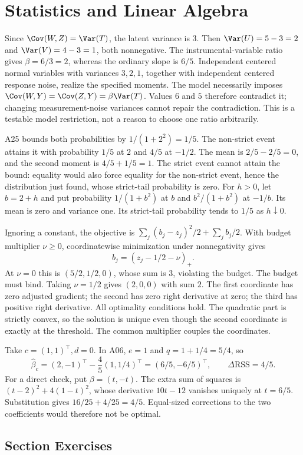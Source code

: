 \section{Statistics and Linear Algebra}

Since $\Cov(W,Z)=\Var(T)$, the latent variance is $3$. Then $\Var(U)=5-3=2$ and $\Var(V)=4-3=1$, both nonnegative. The instrumental-variable ratio gives $\beta=6/3=2$, whereas the ordinary slope is $6/5$. Independent centered normal variables with variances $3,2,1$, together with independent centered response noise, realize the specified moments.
The model necessarily imposes $\Cov(W,Y)=\Cov(Z,Y)=\beta\Var(T)$. Values $6$ and $5$ therefore contradict it; changing measurement-noise variances cannot repair the contradiction. This is a testable model restriction, not a reason to choose one ratio arbitrarily.

A25 bounds both probabilities by $1/(1+2^2)=1/5$. The non-strict event attains it with probability $1/5$ at $2$ and $4/5$ at $-1/2$. The mean is $2/5-2/5=0$, and the second moment is $4/5+1/5=1$.
The strict event cannot attain the bound: equality would also force equality for the non-strict event, hence the distribution just found, whose strict-tail probability is zero. For $h>0$, let $b=2+h$ and put probability $1/(1+b^2)$ at $b$ and $b^2/(1+b^2)$ at $-1/b$. Its mean is zero and variance one. Its strict-tail probability tends to $1/5$ as $h\downarrow0$.

Ignoring a constant, the objective is $\sum_j(b_j-z_j)^2/2+\sum_jb_j/2$. With budget multiplier $\nu\ge0$, coordinatewise minimization under nonnegativity gives
\[
 b_j=(z_j-1/2-\nu)_+.
\]
At $\nu=0$ this is $(5/2,1/2,0)$, whose sum is $3$, violating the budget. The budget must bind. Taking $\nu=1/2$ gives $(2,0,0)$ with sum $2$. The first coordinate has zero adjusted gradient; the second has zero right derivative at zero; the third has positive right derivative. All optimality conditions hold. The quadratic part is strictly convex, so the solution is unique even though the second coordinate is exactly at the threshold. The common multiplier couples the coordinates.

Take $c=(1,1)^\top,d=0$. In A06, $e=1$ and $q=1+1/4=5/4$, so
\[
 \widehat\beta_c=(2,-1)^\top-\frac45(1,1/4)^\top
 =(6/5,-6/5)^\top,
 \qquad\Delta\mathrm{RSS}=4/5.
\]
For a direct check, put $\beta=(t,-t)$. The extra sum of squares is $(t-2)^2+4(1-t)^2$, whose derivative $10t-12$ vanishes uniquely at $t=6/5$. Substitution gives $16/25+4/25=4/5$. Equal-sized corrections to the two coefficients would therefore not be optimal.

\par{}
\subsection*{Section Exercises}




